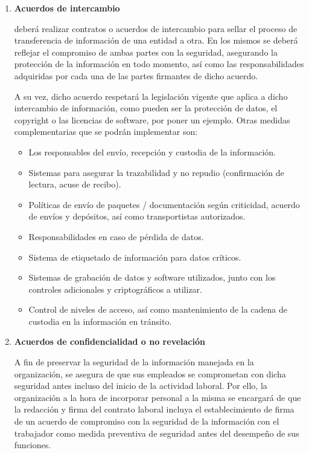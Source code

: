 \begin{enumerate}[label=\alph*)]
\item \textbf{Acuerdos de intercambio}

\Beneficiario{} deberá realizar contratos o acuerdos de intercambio para sellar el proceso de transferencia de información de una entidad a otra. En los mismos se deberá reflejar el compromiso de ambas partes con la seguridad, asegurando la protección de la información en todo momento, así como las responsabilidades adquiridas por cada una de las partes firmantes de dicho acuerdo.

A su vez, dicho acuerdo respetará la legislación vigente que aplica a dicho intercambio de información, como pueden ser la protección de datos, el copyright o las licencias de software, por poner un ejemplo. Otras medidas complementarias que se podrán implementar son:

\begin{itemize}
    \item Los responsables del envío, recepción y custodia de la información.
    \item Sistemas para asegurar la trazabilidad y no repudio (confirmación de lectura, acuse de recibo).
    \item Políticas de envío de paquetes / documentación según criticidad, acuerdo de envíos y depósitos, así como transportistas autorizados.
    \item Responsabilidades en caso de pérdida de datos.
    \item Sistema de etiquetado de información para datos críticos.
    \item Sistemas de grabación de datos y software utilizados, junto con los controles adicionales y criptográficos a utilizar.
    \item Control de niveles de acceso, así como mantenimiento de la cadena de custodia en la información en tránsito.
\end{itemize}

\item \textbf{Acuerdos de confidencialidad o no revelación}

A fin de preservar la seguridad de la información manejada en la organización, \Beneficiario{} se asegura de que sus empleados se comprometan con dicha seguridad antes incluso del inicio de la actividad laboral. Por ello, la organización a la hora de incorporar personal a la misma se encargará de que la redacción y firma del contrato laboral incluya el establecimiento de firma de un acuerdo de compromiso con la seguridad de la información con el trabajador como medida preventiva de seguridad antes del desempeño de sus funciones.


\end{enumerate}
